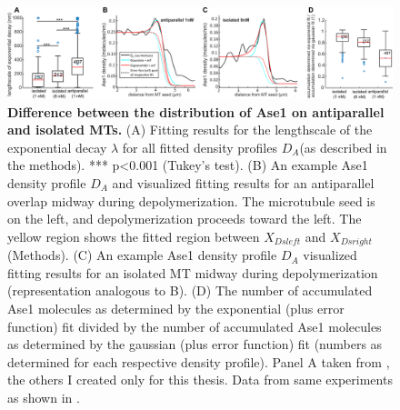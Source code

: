 \begin{figure}[h]
    \centering
    \includegraphics[width=1\linewidth]{Figures/ase2e.png}
    \caption[Difference between the distribution of Ase1 on antiparallel and isolated MTs.]{\textbf{Difference between the distribution of Ase1 on antiparallel and isolated MTs.}
    (A) Fitting results for the lengthscale of the exponential decay $\lambda$ for all fitted density profiles $D_A $(as described in the methods). *** p<0.001 (Tukey's test). (B) An example Ase1 density profile $D_A$ and visualized fitting results for an antiparallel overlap midway during depolymerization. The microtubule seed is on the left, and depolymerization proceeds toward the left. The yellow region shows the fitted region between $X_{Dsleft}$ and $X_{Dsright}$ (Methods). (C) An example Ase1 density profile $D_A$ visualized fitting results for an isolated MT midway during depolymerization (representation analogous to B). (D) The number of accumulated Ase1 molecules as determined by the exponential (plus error function) fit divided by the number of accumulated Ase1 molecules as determined by the gaussian (plus error function) fit (numbers as determined for each respective density profile). Panel A taken from \cite{Krattenmacher2024}, the others I created only for this thesis. Data from same experiments as shown in .
        }\label{ase2e}
\end{figure}